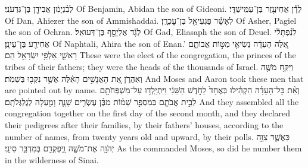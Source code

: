 \documentclass[11pt, openany]{book}
\begin{document}
{לְבִ֨נְיָמִ֔ן אֲבִידָ֖ן בֶּן־גִּדְעֹנִֽי׃}
{Of Benjamin, Abidan the son of Gideoni.}
{לְדָ֕ן אֲחִיעֶ֖זֶר בֶּן־עַמִּֽישַׁדָּֽי׃}
{Of Dan, Ahiezer the son of Ammishaddai.}
{לְאָשֵׁ֕ר פַּגְעִיאֵ֖ל בֶּן־עׇכְרָֽן׃}
{Of Asher, Pagiel the son of Ochran.}
{לְגָ֕ד אֶלְיָסָ֖ף בֶּן־דְּעוּאֵֽל׃}
{Of Gad, Eliasaph the son of Deuel.}
{לְנַ֨פְתָּלִ֔י אֲחִירַ֖ע בֶּן־עֵינָֽן׃}
{Of Naphtali, Ahira the son of Enan.’}
{אֵ֚לֶּה  הָעֵדָ֔ה נְשִׂיאֵ֖י מַטּ֣וֹת אֲבוֹתָ֑ם רָאשֵׁ֛י אַלְפֵ֥י יִשְׂרָאֵ֖ל הֵֽם׃}
{These were the elect of the congregation, the princes of the tribes of their fathers; they were the heads of the thousands of Israel.}
{וַיִּקַּ֥ח מֹשֶׁ֖ה וְאַהֲרֹ֑ן אֵ֚ת הָאֲנָשִׁ֣ים הָאֵ֔לֶּה אֲשֶׁ֥ר נִקְּב֖וּ בְּשֵׁמֹֽת׃}
{And Moses and Aaron took these men that are pointed out by name.}
{וְאֵ֨ת כׇּל־הָעֵדָ֜ה הִקְהִ֗ילוּ בְּאֶחָד֙ לַחֹ֣דֶשׁ הַשֵּׁנִ֔י וַיִּתְיַֽלְד֥וּ עַל־מִשְׁפְּחֹתָ֖ם לְבֵ֣ית אֲבֹתָ֑ם בְּמִסְפַּ֣ר שֵׁמ֗וֹת מִבֶּ֨ן עֶשְׂרִ֥ים שָׁנָ֛ה וָמַ֖עְלָה לְגֻלְגְּלֹתָֽם׃}
{And they assembled all the congregation together on the first day of the second month, and they declared their pedigrees after their families, by their fathers’ houses, according to the number of names, from twenty years old and upward, by their polls.}
{כַּאֲשֶׁ֛ר צִוָּ֥ה יְהֹוָ֖ה אֶת־מֹשֶׁ֑ה וַֽיִּפְקְדֵ֖ם בְּמִדְבַּ֥ר סִינָֽי׃ \setuma }
{As the \lord\space commanded Moses, so did he number them in the wilderness of Sinai.}
\clearpage
\fancyhead[C]{\haftarahname}


\vspace{12pt}
\end{document}
